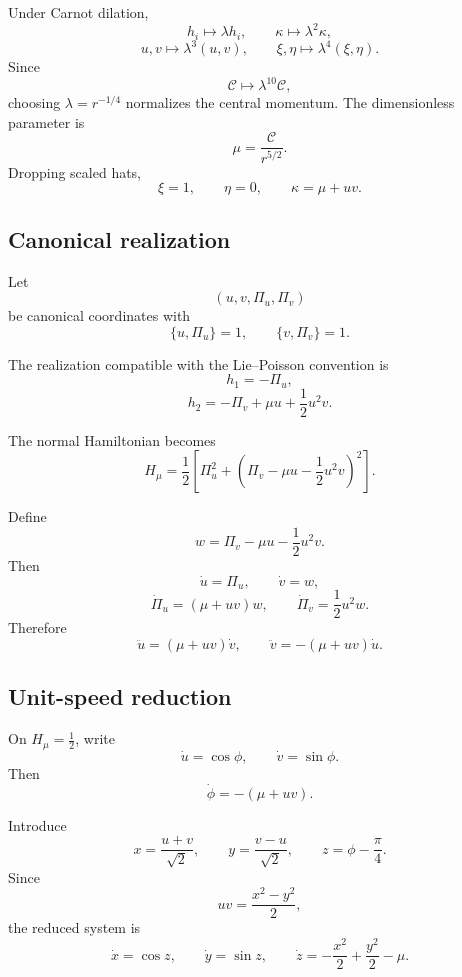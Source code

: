Under Carnot dilation,
\[
h_i\mapsto\lambda h_i,\qquad
\kappa\mapsto\lambda^2\kappa,
\]
\[
u,v\mapsto\lambda^3(u,v),\qquad
\xi,\eta\mapsto\lambda^4(\xi,\eta).
\]
Since
\[
\mathcal C\mapsto\lambda^{10}\mathcal C,
\]
choosing \(\lambda=r^{-1/4}\) normalizes the central momentum. The dimensionless parameter is
\[
\boxed{
\mu=\frac{\mathcal C}{r^{5/2}}.
}
\]
Dropping scaled hats,
\[
\xi=1,\qquad \eta=0,\qquad
\boxed{
\kappa=\mu+uv.
}
\]

\subsection{Canonical realization}

Let
\[
(u,v,\Pi_u,\Pi_v)
\]
be canonical coordinates with
\[
\{u,\Pi_u\}=1,\qquad
\{v,\Pi_v\}=1.
\]

The realization compatible with the Lie--Poisson convention is
\[
\boxed{
h_1=-\Pi_u,
}
\]
\[
\boxed{
h_2=-\Pi_v+\mu u+\frac12u^2v.
}
\]

The normal Hamiltonian becomes
\[
\boxed{
H_\mu
=
\frac12
\left[
\Pi_u^2+
\left(
\Pi_v-\mu u-\frac12u^2v
\right)^2
\right].
}
\]

Define
\[
w=\Pi_v-\mu u-\frac12u^2v.
\]
Then
\[
\dot u=\Pi_u,\qquad
\dot v=w,
\]
\[
\dot\Pi_u=(\mu+uv)w,\qquad
\dot\Pi_v=\frac12u^2w.
\]
Therefore
\[
\boxed{
\ddot u=(\mu+uv)\dot v,\qquad
\ddot v=-(\mu+uv)\dot u.
}
\]

\subsection{Unit-speed reduction}

On \(H_\mu=\tfrac12\), write
\[
\dot u=\cos\phi,\qquad
\dot v=\sin\phi.
\]
Then
\[
\boxed{
\dot\phi=-(\mu+uv).
}
\]

Introduce
\[
x=\frac{u+v}{\sqrt2},\qquad
y=\frac{v-u}{\sqrt2},\qquad
z=\phi-\frac{\pi}{4}.
\]
Since
\[
uv=\frac{x^2-y^2}{2},
\]
the reduced system is
\[
\boxed{
\dot x=\cos z,\qquad
\dot y=\sin z,\qquad
\dot z=-\frac{x^2}{2}+\frac{y^2}{2}-\mu.
}
\]
